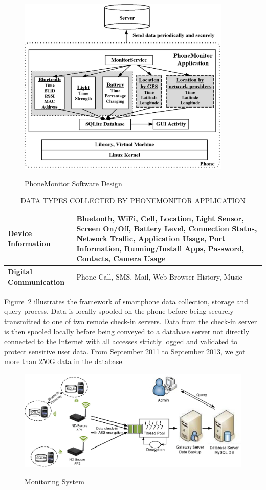 \begin{figure}[h!tbp]
\centering 
{\includegraphics[width=4in]{graphs/Figure1.eps}}
\caption{PhoneMonitor Software Design} 
\label{fig:agent}
\end{figure} 

\begin{table}[ht] 
\caption{DATA TYPES COLLECTED BY PHONEMONITOR APPLICATION} 
\centering  
\begin{tabular}{|l|m{10cm}|}
\hline
{\bf Device Information} & Bluetooth, WiFi, Cell, Location, Light Sensor, Screen On/Off, Battery Level, Connection Status, Network Traffic, Application Usage, Port Information, Running/Install Apps, Password, Contacts, Camera Usage\\
\hline
{\bf Digital Communication} & Phone Call, SMS, Mail, Web Browser History, Music\\
\hline
\end{tabular}
\label{table:data} 
\end{table}

Figure~\ref{fig:system} illustrates the framework of smartphone data collection, storage and query process. Data is locally spooled on the phone before being securely transmitted to one of two remote check-in servers.  Data from the check-in server is then spooled locally before being conveyed to a database server not directly connected to the Internet with all accesses strictly logged and validated to protect sensitive user data. From September 2011 to September 2013, we got more than 250G data in the database. 

\begin{figure}[h!tbp]
\centering 
{\includegraphics[width=6in]{graphs/system.eps}}
\caption{Monitoring System} 
\label{fig:system}
\end{figure} 

